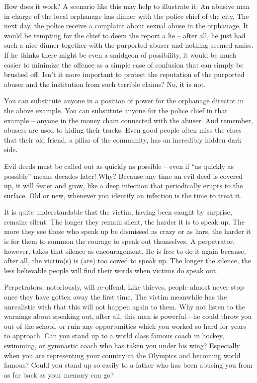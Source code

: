 \documentclass[]{book}
\begin{document}
How does it work? A scenario like this may help to illustrate it: An abusive man in charge of the local orphanage has dinner with the police chief of the city. The next day, the police receive a complaint about sexual abuse in the orphanage. It would be tempting for the chief to deem the report a lie -- after all, he just had such a nice dinner together with the purported abuser and nothing seemed amiss. If he thinks there might be even a smidgeon of possibility, it would be much easier to minimize the offence as a simple case of confusion that can simply be brushed off. Isn't it more important to protect the reputation of the purported abuser and the institution from such terrible claims? No, it is not.

You can substitute anyone in a position of power for the orphanage director in the above example. You can substitute anyone for the police chief in that example -- anyone in the money chain connected with the abuser. And remember, abusers are used to hiding their tracks. Even good people often miss the clues that their old friend, a pillar of the community, has an incredibly hidden dark side.

Evil deeds must be called out as quickly as possible -- even if ``as quickly as possible'' means decades later! Why? Because any time an evil deed is covered up, it will fester and grow, like a deep infection that periodically erupts to the surface. Old or new, whenever you identify an infection is the time to treat it.

It is quite understandable that the victim, having been caught by surprise, remains silent. The longer they remain silent, the harder it is to speak up. The more they see those who speak up be dismissed as crazy or as liars, the harder it is for them to summon the courage to speak out themselves. A perpetrator, however, takes that silence as encouragement. He is free to do it again because, after all, the victim(s) is (are) too cowed to speak up. The longer the silence, the less believable people will find their words when victims do speak out.

Perpetrators, notoriously, will re-offend. Like thieves, people almost never stop once they have gotten away the first time. The victim meanwhile has the unrealistic wish that this will not happen again to them. Why not listen to the warnings about speaking out, after all, this man is powerful---he could throw you out of the school, or ruin any opportunities which you worked so hard for years to approach. Can you stand up to a world class famous coach in hockey, swimming, or gymnastic coach who has taken you under his wing? Especially when you are representing your country at the Olympics and becoming world famous? Could you stand up so easily to a father who has been abusing you from as far back as your memory can go?
\end{document}
